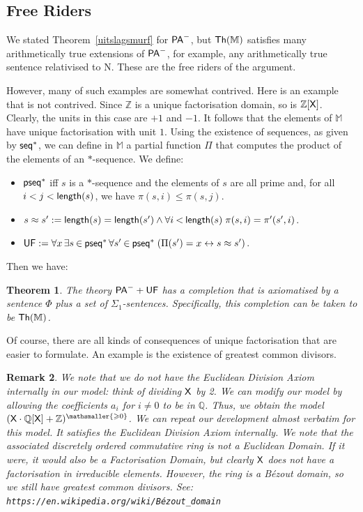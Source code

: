 \documentclass{amsart}
\renewcommand{\iff}{\leftrightarrow}
\renewcommand{\leq}{\leqslant}
\renewcommand{\geq}{\geqslant}
\renewcommand{\Phi}{\varPhi}
\newtheorem{theorem}{Theorem}[section]
\newtheorem{rem}[theorem]{Remark}
\newcommand{\bles}{\mathbin{<}}
\newcommand{\bin}{\mathbin{\in}}
\newcommand{\pam}{\ensuremath{{\sf PA}^{-}}}
\newcommand{\X}{{\sf X}}
\begin{document}
\subsection{Free Riders}

We stated Theorem~\ref{uitslagsmurf} for ${\sf PA}^-$, but ${\sf Th}(\mathbb M)$
satisfies many arithmetically true extensions of ${\sf PA}^-$, for example, any
arithmetically true sentence relativised to {\sf N}. These are the free riders
of the argument.  

However, many of such examples are somewhat contrived. Here is an example that is not
contrived. Since $\mathbb Z$ is a unique factorisation domain, so is $\mathbb Z[\X]$.
Clearly, the units in this case are $+1$ and $-1$. It follows that the elements of
$\mathbb M$ have unique factorisation with unit $1$. Using the existence of sequences,
as given by ${\sf seq}^\ast$,
we can define in $\mathbb M$ a partial function $\Pi$ that computes the product of the
elements of an $\ast$-sequence. 
We define:
\begin{itemize}
\item 
${\sf pseq}^\ast$ iff 
$s$ is a $\ast$-sequence and the elements
of $s$ are all prime and, for all $i<j<{\sf length}(s)$, we have $\pi(s,i)\leq \pi(s,j)$. 
\item 
$s\approx s' := {\sf length}(s) = {\sf length}(s') \wedge \forall i\bles {\sf length} (s) \; \pi(s,i)=\pi'(s',i)$.
    \item 
    ${\sf UF} := \forall x\, \exists s\bin {\sf pseq}^\ast \,\forall s'\bin {\sf pseq}^\ast \; (\Pi(s')=x \iff s \approx s')$.
\end{itemize}

Then we have: 
\begin{theorem}\label{uitslag2smurf}
    The theory $\pam+{\sf UF}$ has a completion that is axiomatised by a sentence $\Phi$ plus a set of $\Sigma_1$-sentences. 
    Specifically, this completion can be taken to be ${\sf Th}(\mathbb M)$.
\end{theorem}

Of course, there are all kinds of consequences of unique factorisation that are easier to formulate. An example is the existence
of greatest common divisors.

\begin{rem}    
We note that we do \emph{not} have the Euclidean Division Axiom internally in our model: think of dividing $\X$ by 2. We can modify our model
by allowing the coefficients $a_i$ for $i\neq 0$ to be in $\mathbb Q$. Thus, we obtain the model
$(\X\cdot \mathbb Q[\X] +\mathbb Z)^{\mathsmaller{\geq 0}}$. We can repeat our development almost verbatim
for this model. It satisfies the Euclidean Division Axiom internally.
We note that the associated discretely ordered commutative ring is  \emph{not} a 
Euclidean Domain. If it were, it would also be a Factorisation Domain, but clearly $\X$ does not have a factorisation
in irreducible elements.
However, the ring is a B\'ezout domain, so we still have greatest common divisors.
See:
{\tt https://en.wikipedia.org/wiki/B\'ezout\_domain}
\end{rem}
\end{document}

